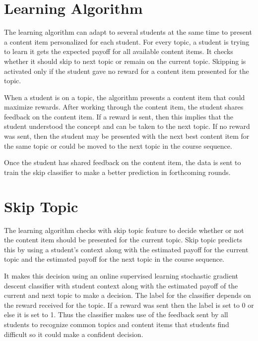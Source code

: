 \section{Learning Algorithm \label{chap5:learningAlgorithm}}

The learning algorithm can adapt to several students at the same time to present a content item personalized for each student. For every topic, a student is trying to learn it gets the expected payoff for all available content items. It checks whether it should skip to next topic or remain on the current topic. Skipping is activated only if the student gave no reward for a content item presented for the topic. \par

When a student is on a topic, the algorithm presents a content item that could maximize rewards. After working through the content item, the student shares feedback on the content item. If a reward is sent, then this implies that the student understood the concept and can be taken to the next topic. If no reward was sent, then the student may be presented with the next best content item for the same topic or could be moved to the next topic in the course sequence.\par 

Once the student has shared feedback on the content item, the data is sent to train the skip classifier to make a better prediction in forthcoming rounds. \par

\section{Skip Topic \label{chap5:skipTopics}}

The learning algorithm checks with skip topic feature to decide whether or not the content item should be presented for the current topic. Skip topic predicts this by using a student's context along with the estimated payoff for the current topic and the estimated payoff for the next topic in the course sequence. \par

It makes this decision using an online supervised learning stochastic gradient descent classifier with student context along with the estimated payoff of the current and next topic to make a decision. The label for the classifier depends on the reward received for the topic. If a reward was sent then the label is set to 0 or else it is set to 1. Thus the classifier makes use of the feedback sent by all students to recognize common topics and content items that students find difficult so it could make a confident decision. \par

